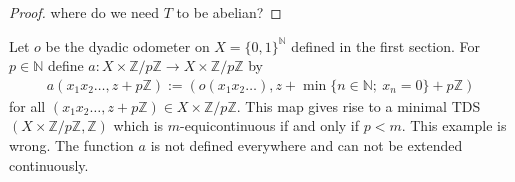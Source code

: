 \begin{proof}
	{ \color{red} where do we need $T$ to be abelian?}
 \end{proof}

\begin{example}
	Let $o$ be the dyadic odometer on $X = \{0, 1\}^\mathbb{N}$ defined in the first section. For $p \in \mathbb{N}$ define $a: X \times \mathbb{Z}/p\mathbb{Z} \to X \times \mathbb{Z}/p\mathbb{Z}$ by
	\begin{align*}
		a(x_1x_2\dots, z + p\mathbb{Z}) := (o(x_1x_2\dots), z + \min \{n \in \mathbb{N};\ x_n = 0\} + p\mathbb{Z})
	\end{align*}
	for all $(x_1x_2\dots, z + p\mathbb{Z}) \in X \times \mathbb{Z}/p\mathbb{Z}$. This map gives rise to a minimal TDS $(X \times \mathbb{Z}/p\mathbb{Z}, \mathbb{Z})$ which is $m$-equicontinuous if and only if $p < m$. \color{red} This example is wrong. The function $a$ is not defined everywhere and can not be extended continuously.
\end{example}
